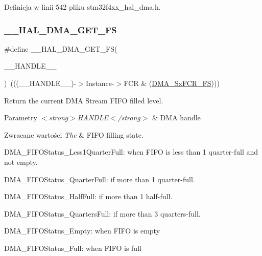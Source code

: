Definicja w linii 542 pliku stm32f4xx\+\_\+hal\+\_\+dma.\+h.

\mbox{\label{group___d_m_a_ga8f0ff408d25904040b9d23ee7f6af080}} 
\subsubsection{\texorpdfstring{\+\_\+\+\_\+\+H\+A\+L\+\_\+\+D\+M\+A\+\_\+\+G\+E\+T\+\_\+\+FS}{\_\_HAL\_DMA\_GET\_FS}}
{\footnotesize\ttfamily \#define \+\_\+\+\_\+\+H\+A\+L\+\_\+\+D\+M\+A\+\_\+\+G\+E\+T\+\_\+\+FS(\begin{DoxyParamCaption}\item[{}]{\+\_\+\+\_\+\+H\+A\+N\+D\+L\+E\+\_\+\+\_\+ }\end{DoxyParamCaption})~(((\+\_\+\+\_\+\+H\+A\+N\+D\+L\+E\+\_\+\+\_\+)-\/$>$Instance-\/$>$F\+CR \& (\hyperlink{group___peripheral___registers___bits___definition_ga56094479dc9b173b00ccfb199d8a2853}{D\+M\+A\+\_\+\+Sx\+F\+C\+R\+\_\+\+FS})))}



Return the current D\+MA Stream F\+I\+FO filled level. 


\begin{DoxyParams}{Parametry}
{\em $<$strong$>$\+H\+A\+N\+D\+L\+E$<$/strong$>$} & D\+MA handle \\
\hline
\end{DoxyParams}

\begin{DoxyRetVals}{Zwracane wartości}
{\em The} & F\+I\+FO filling state.
\begin{DoxyItemize}
\item D\+M\+A\+\_\+\+F\+I\+F\+O\+Status\+\_\+\+Less1\+Quarter\+Full\+: when F\+I\+FO is less than 1 quarter-\/full and not empty.
\item D\+M\+A\+\_\+\+F\+I\+F\+O\+Status\+\_\+Quarter\+Full\+: if more than 1 quarter-\/full.
\item D\+M\+A\+\_\+\+F\+I\+F\+O\+Status\+\_\+\+Half\+Full\+: if more than 1 half-\/full.
\item D\+M\+A\+\_\+\+F\+I\+F\+O\+Status\+\_\+Quarters\+Full\+: if more than 3 quarters-\/full.
\item D\+M\+A\+\_\+\+F\+I\+F\+O\+Status\+\_\+\+Empty\+: when F\+I\+FO is empty
\item D\+M\+A\+\_\+\+F\+I\+F\+O\+Status\+\_\+\+Full\+: when F\+I\+FO is full 
\end{DoxyItemize}\\
\hline
\end{DoxyRetVals}


